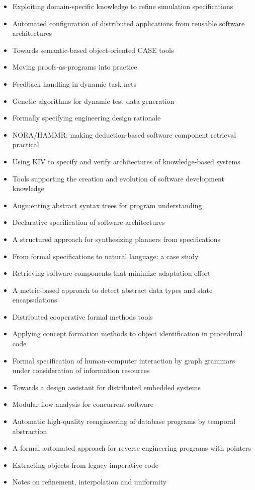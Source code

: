 {\begin{itemize}[itemsep=-1ex]
  \item Exploiting domain-specific knowledge to refine simulation specifications
  \item Automated configuration of distributed applications from reusable software architectures
  \item Towards semantic-based object-oriented CASE tools
  \item Moving proofs-as-programs into practice
  \item Feedback handling in dynamic task nets
  \item Genetic algorithms for dynamic test data generation
  \item Formally specifying engineering design rationale
  \item NORA/HAMMR: making deduction-based software component retrieval practical
  \item Using KIV to specify and verify architectures of knowledge-based systems
  \item Tools supporting the creation and evolution of software development knowledge
  \item Augmenting abstract syntax trees for program understanding
  \item Declarative specification of software architectures
  \item A structured approach for synthesizing planners from specifications
  \item From formal specifications to natural language: a case study
  \item Retrieving software components that minimize adaptation effort
  \item A metric-based approach to detect abstract data types and state encapsulations
  \item Distributed cooperative formal methods tools
  \item Applying concept formation methods to object identification in procedural code
  \item Formal specification of human-computer interaction by graph grammars under consideration of information resources
  \item Towards a design assistant for distributed embedded systems
  \item Modular flow analysis for concurrent software
  \item Automatic high-quality reengineering of database programs by temporal abstraction
  \item A formal automated approach for reverse engineering programs with pointers
  \item Extracting objects from legacy imperative code
  \item Notes on refinement, interpolation and uniformity
\end{itemize}
}

